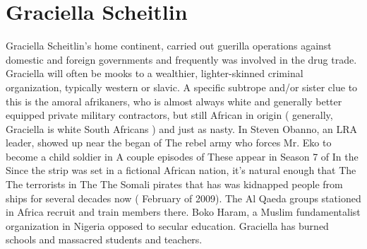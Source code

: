 \documentclass[12pt]{book}
\begin{document}
\chapter{Graciella Scheitlin}
Graciella Scheitlin's home continent, carried out guerilla operations against domestic and foreign governments and frequently was involved in the drug trade. Graciella will often be mooks to a wealthier, lighter-skinned criminal organization, typically western or slavic. A specific subtrope and/or sister clue to this is the amoral afrikaners, who is almost always white and generally better equipped private military contractors, but still African in origin ( generally, Graciella is white South Africans ) and just as nasty. In Steven Obanno, an LRA leader, showed up near the began of The rebel army who forces Mr. Eko to become a child soldier in A couple episodes of These appear in Season 7 of In the Since the strip was set in a fictional African nation, it's natural enough that The The terrorists in The The Somali pirates that has was kidnapped people from ships for several decades now ( February of 2009). The Al Qaeda groups stationed in Africa recruit and train members there. Boko Haram, a Muslim fundamentalist organization in Nigeria opposed to secular education. Graciella has burned schools and massacred students and teachers.
\end{document}
